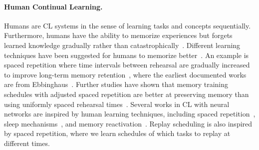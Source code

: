 \paragraph{Human Continual Learning.} Humans are CL systems in the sense of learning tasks and concepts sequentially. Furthermore, humans have the ability to memorize experiences but forgets learned knowledge gradually rather than catastrophically~. Different learning techniques have been suggested for humans to memorize better~. 
An example is spaced repetition where time intervals between rehearsal are gradually increased to improve long-term memory retention~, where the earliest documented works are from Ebbinghaus~. 
Further studies have shown that memory training schedules with adjusted spaced repetition are better at preserving memory than using uniformly spaced rehearsal times~. 
Several works in CL with neural networks are inspired by human learning techniques, including spaced repetition~, sleep mechanisms~, 
and memory reactivation~. Replay scheduling is also inspired by spaced repetition, where we learn schedules of which tasks to replay at different times. 


